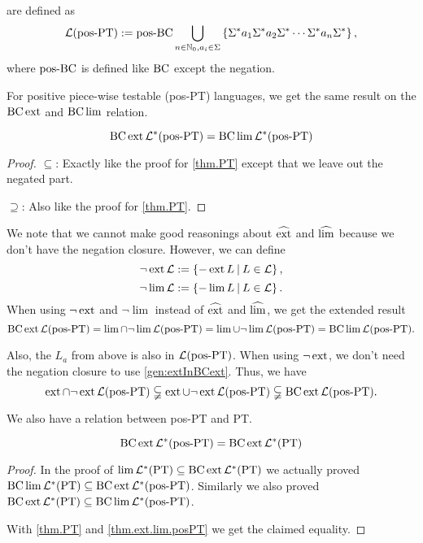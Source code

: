 \

\label{lang:posPT}
 are defined as
\[ \Lang(\posPT) := \posBC \bigcup_{n\in\N_0,a_i \in \Sigma} \Set{\Sigma^* a_1 \Sigma^* a_2 \Sigma^* \cdots\Sigma^* a_n \Sigma^*} , \]
where $\operatorname{pos-BC}$ is defined like $\operatorname{BC}$ except the negation.

For positive piece-wise testable (pos-PT) languages, we get the same result on the $\operatorname{BC} \operatorname{ext}$ and $\operatorname{BC} \lim$ relation.

\begin{theorem}
\label{thm.ext.lim.posPT}
\[ \operatorname{BC} \operatorname{ext} \mathcal{L}^* (\textup{\textrm{pos-PT}}) = \operatorname{BC} \lim \mathcal{L}^* (\textup{\textrm{pos-PT}}) \]
\begin{proof}
$\subseteq$: Exactly like the proof for \cref{thm.PT} except that we leave out the negated part.

$\supseteq$: Also like the proof for \cref{thm.PT}.
\end{proof}
\end{theorem}

We note that we cannot make good reasonings about $\operatorname{\widehat{ext}}$ and $\operatorname{\widehat{lim}}$ because we don't have the negation closure. However, we can define
\[ \neg\ext \Lang := \Set{-\ext L}{L \in \Lang} , \]
\[ \neg\lim \Lang := \Set{-\lim L}{L \in \Lang} . \]
When using $\neg\operatorname{ext}$ and $\neg\lim$ instead of $\operatorname{\widehat{ext}}$ and $\operatorname{\widehat{lim}}$, we get the extended result
\[ \operatorname{BC} \operatorname{ext} \mathcal{L}(\textup{\textrm{pos-PT}}) =
\lim \cap \neg\lim \mathcal{L}(\textup{\textrm{pos-PT}}) =
\lim \cup \neg\lim \mathcal{L}(\textup{\textrm{pos-PT}}) =
\operatorname{BC} \lim \mathcal{L}(\textup{\textrm{pos-PT}}) .\]

Also, the $L_a$ from above is also in $\mathcal{L}(\textup{\textrm{pos-PT}})$. When using $\neg\operatorname{ext}$, we don't need the negation closure to use \cref{gen:extInBCext}. Thus, we have
\[ \operatorname{ext} \cap \neg\operatorname{ext} \mathcal{L}(\textup{\textrm{pos-PT}}) \subsetneqq
\operatorname{ext} \cup \neg\operatorname{ext} \mathcal{L}(\textup{\textrm{pos-PT}}) \subsetneqq
\operatorname{BC} \operatorname{ext} \mathcal{L}(\textup{\textrm{pos-PT}}) . \]

We also have a relation between pos-PT and PT.

\begin{lemma}
\[ \operatorname{BC} \operatorname{ext} \mathcal{L}^*(\textup{\textrm{pos-PT}}) = \operatorname{BC} \operatorname{ext} \mathcal{L}^* (\textup{\textrm{PT}}) \]

\begin{proof}
In the proof of $\lim \mathcal{L}^*(\textup{\textrm{PT}}) \subseteq \operatorname{BC} \operatorname{ext} \mathcal{L}^* (\textup{\textrm{PT}})$ we actually proved $\operatorname{BC} \lim \mathcal{L}^*(\textup{\textrm{PT}}) \subseteq \operatorname{BC} \operatorname{ext} \mathcal{L}^* (\textup{\textrm{pos-PT}})$. Similarly we also proved $\operatorname{BC} \operatorname{ext} \mathcal{L}^* (\textup{\textrm{PT}}) \subseteq \operatorname{BC} \lim \mathcal{L}^* (\textup{\textrm{pos-PT}})$.

With \cref{thm.PT} and \cref{thm.ext.lim.posPT} we get the claimed equality.
\end{proof}
\end{lemma}

